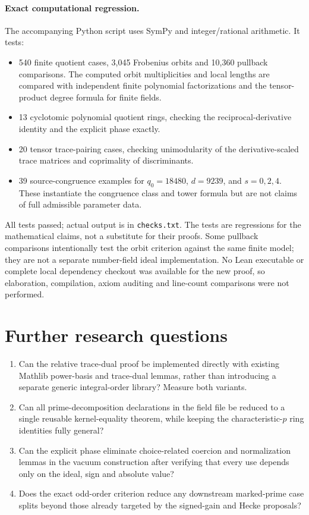 \documentclass[11pt]{article}
\begin{document}
\paragraph{Exact computational regression.} The accompanying Python script uses SymPy and integer/rational arithmetic. It tests:
\begin{itemize}
\item 540 finite quotient cases, 3,045 Frobenius orbits and 10,360 pullback comparisons. The computed orbit multiplicities and local lengths are compared with independent finite polynomial factorizations and the tensor-product degree formula for finite fields.
\item 13 cyclotomic polynomial quotient rings, checking the reciprocal-derivative identity and the explicit phase exactly.
\item 20 tensor trace-pairing cases, checking unimodularity of the derivative-scaled trace matrices and coprimality of discriminants.
\item 39 source-congruence examples for $q_0=18480$, $d=9239$, and $s=0,2,4$. These instantiate the congruence class and tower formula but are not claims of full admissible parameter data.
\end{itemize}
All tests passed; actual output is in \texttt{checks.txt}. The tests are regressions for the mathematical claims, not a substitute for their proofs. Some pullback comparisons intentionally test the orbit criterion against the same finite model; they are not a separate number-field ideal implementation. No Lean executable or complete local dependency checkout was available for the new proof, so elaboration, compilation, axiom auditing and line-count comparisons were not performed.

\section{Further research questions}
\begin{enumerate}
\item Can the relative trace-dual proof be implemented directly with existing Mathlib power-basis and trace-dual lemmas, rather than introducing a separate generic integral-order library? Measure both variants.
\item Can all prime-decomposition declarations in the field file be reduced to a single reusable kernel-equality theorem, while keeping the characteristic-$p$ ring identities fully general?
\item Can the explicit phase eliminate choice-related coercion and normalization lemmas in the vacuum construction after verifying that every use depends only on the ideal, sign and absolute value?
\item Does the exact odd-order criterion reduce any downstream marked-prime case splits beyond those already targeted by the signed-gain and Hecke proposals?
\end{enumerate}
\end{document}
